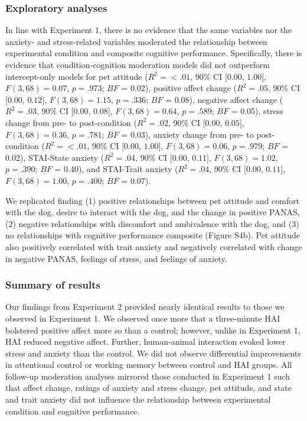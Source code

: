 \documentclass[
  english,
  pub,floatsintext]{apa6}
\begin{document}
\hypertarget{exploratory-analyses-1}{%
\subsubsection{Exploratory analyses}\label{exploratory-analyses-1}}

In line with Experiment 1, there is no evidence that the same variables nor the anxiety- and stress-related variables moderated the relationship between experimental condition and composite cognitive performance. Specifically, there is evidence that condition-cognition moderation models did not outperform intercept-only models for pet attitude (\(R^2 = < .01\), 90\% CI \([0.00\), \(1.00]\), \(F(3, 68) = 0.07\), \(p = .973\); \(BF\) = 0.02), positive affect change (\(R^2 = .05\), 90\% CI \([0.00\), \(0.12]\), \(F(3, 68) = 1.15\), \(p = .336\); \(BF\) = 0.08), negative affect change (\(R^2 = .03\), 90\% CI \([0.00\), \(0.08]\), \(F(3, 68) = 0.64\), \(p = .589\); \(BF\) = 0.05), stress change from pre- to post-condition (\(R^2 = .02\), 90\% CI \([0.00\), \(0.05]\), \(F(3, 68) = 0.36\), \(p = .781\); \(BF\) = 0.03), anxiety change from pre- to post-condition (\(R^2 = < .01\), 90\% CI \([0.00\), \(1.00]\), \(F(3, 68) = 0.06\), \(p = .979\); \(BF\) = 0.02), STAI-State anxiety (\(R^2 = .04\), 90\% CI \([0.00\), \(0.11]\), \(F(3, 68) = 1.02\), \(p = .390\); \(BF\) = 0.40), and STAI-Trait anxiety (\(R^2 = .04\), 90\% CI \([0.00\), \(0.11]\), \(F(3, 68) = 1.00\), \(p = .400\); \(BF\) = 0.07).

We replicated finding (1) positive relationships between pet attitude and comfort with the dog, desire to interact with the dog, and the change in positive PANAS, (2) negative relationships with discomfort and ambivalence with the dog, and (3) no relationships with cognitive performance composite (Figure S4b). Pet attitude also positively correlated with trait anxiety and negatively correlated with change in negative PANAS, feelings of stress, and feelings of anxiety.

\hypertarget{summary-of-results-1}{%
\subsubsection{Summary of results}\label{summary-of-results-1}}

Our findings from Experiment 2 provided nearly identical results to those we observed in Experiment 1. We observed once more that a three-minute HAI bolstered positive affect more so than a control; however, unlike in Experiment 1, HAI reduced negative affect. Further, human-animal interaction evoked lower stress and anxiety than the control. We did not observe differential improvements in attentional control or working memory between control and HAI groups. All follow-up moderation analyses mirrored those conducted in Experiment 1 such that affect change, ratings of anxiety and stress change, pet attitude, and state and trait anxiety did not influence the relationship between experimental condition and cognitive performance.
\end{document}
